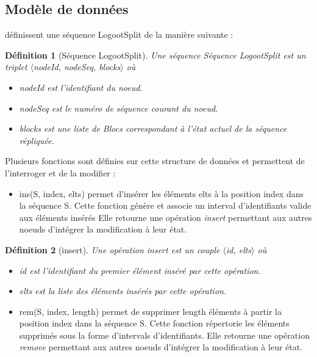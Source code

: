 \documentclass[12pt]{thesul}
\newtheorem{definition}{Définition}
\begin{document}
\subsection{Modèle de données}

\textcite{2013-logootsplit} définissent une séquence LogootSplit de la manière suivante :

\begin{definition}[Séquence LogootSplit]
  Une séquence \emph{Séquence LogootSplit} est un triplet $\langle$nodeId, nodeSeq, blocks$\rangle$ où
  \begin{itemize}
    \item nodeId est l'identifiant du noeud.
    \item nodeSeq est le numéro de séquence courant du noeud.
    \item blocks est une liste de Blocs correspondant à l'état actuel de la séquence répliquée.
  \end{itemize}
\end{definition}

Plusieurs fonctions sont définies sur cette structure de données et permettent de l'interroger et de la modifier :

\begin{itemize}
  \item ins(S, index, elts) permet d'insérer les éléments elts à la position index dans la séquence S.
    Cette fonction génère et associe un interval d'identifiants valide aux éléments insérés
    Elle retourne une opération \emph{insert} permettant aux autres noeuds d'intégrer la modification à leur état.
\end{itemize}

\begin{definition}[insert]
  Une opération \emph{insert} est un couple $\langle$id, elts$\rangle$ où
  \begin{itemize}
    \item id est l'identifiant du premier élément inséré par cette opération.
    \item elts est la liste des éléments insérés par cette opération.
  \end{itemize}
\end{definition}

\begin{itemize}
  \item rem(S, index, length) permet de supprimer length éléments à partir la position index dans la séquence S.
  Cette fonction répertorie les éléments supprimés sous la forme d'intervals d'identifiants.
  Elle retourne une opération \emph{remove} permettant aux autres noeuds d'intégrer la modification à leur état.
\end{itemize}
\end{document}
